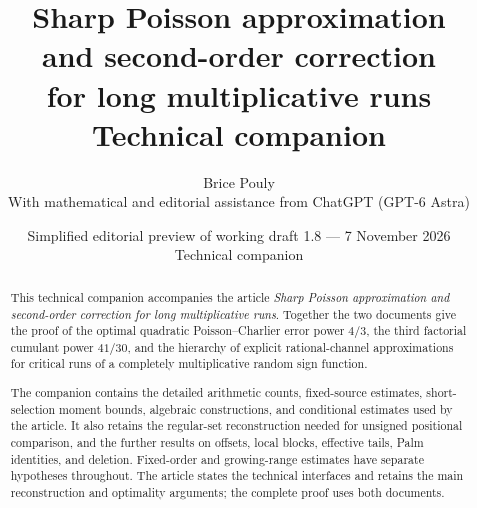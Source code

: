 \documentclass[11pt,a4paper]{article}
\title{\bfseries Sharp Poisson approximation\\and second-order correction\\for long multiplicative runs\\[9pt]\large Technical companion}
\author{Brice Pouly\\[5pt]
 \small With mathematical and editorial assistance from ChatGPT (GPT-6 Astra)}
\date{\small Simplified editorial preview of working draft 1.8 --- 7 November 2026\\[3pt]Technical companion}
\begin{document}
\maketitle
\thispagestyle{plain}
\begin{abstract}
This technical companion accompanies the article \emph{Sharp Poisson
approximation and second-order correction for long multiplicative runs}.
Together the two documents give the proof of the optimal quadratic
Poisson--Charlier error power \(4/3\), the third factorial cumulant
power \(41/30\), and the hierarchy of explicit rational-channel
approximations for critical runs of a completely multiplicative
random sign function.

The companion contains the detailed arithmetic counts, fixed-source
estimates, short-selection moment bounds, algebraic constructions,
and conditional estimates used by the article. It also retains the
regular-set reconstruction needed for unsigned positional comparison,
and the further results on offsets, local blocks, effective tails,
Palm identities, and deletion. Fixed-order and growing-range
estimates have separate hypotheses throughout. The article states
the technical interfaces and retains the main reconstruction and
optimality arguments; the complete proof uses both documents.
\end{abstract}
\clearpage
\begingroup
\small
\setlength{\parskip}{0pt}
\tableofcontents
\endgroup
\clearpage























\clearpage

\end{document}
